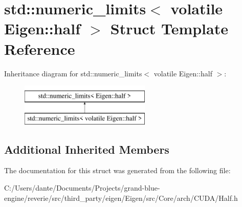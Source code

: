 \hypertarget{structstd_1_1numeric__limits_3_01volatile_01_eigen_1_1half_01_4}{}\section{std\+::numeric\+\_\+limits$<$ volatile Eigen\+::half $>$ Struct Template Reference}
\label{structstd_1_1numeric__limits_3_01volatile_01_eigen_1_1half_01_4}
Inheritance diagram for std\+::numeric\+\_\+limits$<$ volatile Eigen\+::half $>$\+:\begin{figure}[H]
\begin{center}
\leavevmode
\includegraphics[height=2.000000cm]{structstd_1_1numeric__limits_3_01volatile_01_eigen_1_1half_01_4}
\end{center}
\end{figure}
\subsection*{Additional Inherited Members}


The documentation for this struct was generated from the following file\+:\begin{DoxyCompactItemize}
\item 
C\+:/\+Users/dante/\+Documents/\+Projects/grand-\/blue-\/engine/reverie/src/third\+\_\+party/eigen/\+Eigen/src/\+Core/arch/\+C\+U\+D\+A/Half.\+h\end{DoxyCompactItemize}
